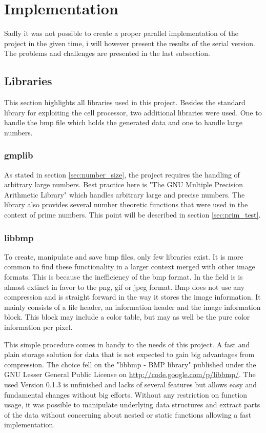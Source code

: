 \section{Implementation}
\label{sec:implementation}
Sadly it was not possible to create a proper parallel implementation of the project in the given time, i will however present the results of the serial version. The problems and challenges are presented in the last subsection.

\subsection{Libraries}
\label{sec:libs}
This section highlights all libraries used in this project. Besides the standard library for exploiting the cell processor, two additional libraries were used. One to handle the bmp file which holds the generated data and one to handle large numbers.

\subsubsection{gmplib}
As stated in section \ref{sec:number_size}, the project requires the handling of arbitrary large numbers. Best practice here is "The GNU Multiple Precision Arithmetic Library" which handles arbitrary large and precise numbers. The library also provides several number theoretic functions that were used in the context of prime numbers. This point will be described in section \ref{sec:prim_test}.

\subsubsection{libbmp}
To create, manipulate and save bmp files, only few libraries exist. It is more common to find these functionality in a larger context merged with other image formats. This is because the inefficiency of the bmp format. In the field is is almost extinct in favor to the png, gif or jpeg format. Bmp does not use any compression and is straight forward in the way it stores the image information. It mainly consists of a file header, an information header and the image information block. This block may include a color table, but may as well be the pure color information per pixel.

This simple procedure comes in handy to the needs of this project. A fast and plain storage solution for data that is not expected to gain big advantages from compression. The choice fell on the "libbmp - BMP library" published under the GNU Lesser General Public License on \url{http://code.google.com/p/libbmp/}. The used Version 0.1.3 is unfinished and lacks of several features but allows easy and fundamental changes without big efforts. Without any restriction on function usage, it was possible to manipulate underlying data structures and extract parts of the data without concerning about nested or static functions allowing a fast implementation.

